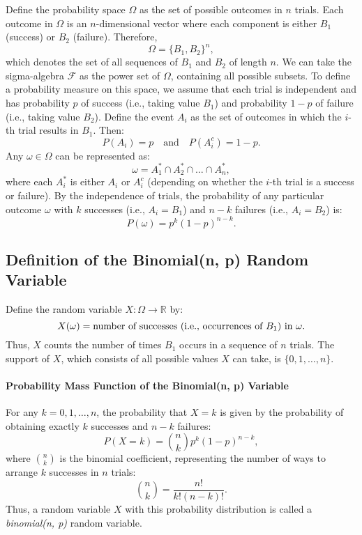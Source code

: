 Define the probability space \( \Omega \) as the set of possible outcomes in \( n \) trials. Each outcome in \( \Omega \) is an \( n \)-dimensional vector where each component is either \( B_1 \) (success) or \( B_2 \) (failure). Therefore, 
\[
\Omega = \{ B_1, B_2 \}^n,
\]
which denotes the set of all sequences of \( B_1 \) and \( B_2 \) of length \( n \). We can take the sigma-algebra \( \mathcal{F} \) as the power set of \( \Omega \), containing all possible subsets. To define a probability measure on this space, we assume that each trial is independent and has probability \( p \) of success (i.e., taking value \( B_1 \)) and probability \( 1 - p \) of failure (i.e., taking value \( B_2 \)). Define the event \( A_i \) as the set of outcomes in which the \( i \)-th trial results in \( B_1 \). Then:
\[
P(A_i) = p \quad \text{and} \quad P(A_i^c) = 1 - p.
\]
Any \(\omega \in \Omega\) can be represented as:
\[
\omega = A_1^{*} \cap A_2^{*} \cap \dots \cap A_n^{*},
\]
where each \( A_i^{*} \) is either \( A_i \) or \( A_i^c \) (depending on whether the \( i \)-th trial is a success or failure). \newline
By the independence of trials, the probability of any particular outcome \(\omega\) with \( k \) successes (i.e., \( A_i = B_1 \)) and \( n - k \) failures (i.e., \( A_i = B_2 \)) is:
\[
P(\omega) = p^k (1 - p)^{n - k}.
\]

\subsection{Definition of the Binomial(n, p) Random Variable}
Define the random variable \( X: \Omega \to \mathbb{R} \) by:
\[
X(\omega) = \text{number of successes (i.e., occurrences of \( B_1 \)) in } \omega.
\]
Thus, \( X \) counts the number of times \( B_1 \) occurs in a sequence of \( n \) trials. \newline
The support of \( X \), which consists of all possible values \( X \) can take, is \( \{0, 1, \dots, n\} \).

\paragraph{Probability Mass Function of the Binomial(n, p) Variable}

For any \( k = 0, 1, \dots, n \), the probability that \( X = k \) is given by the probability of obtaining exactly \( k \) successes and \( n - k \) failures:
\[
P(X = k) = \binom{n}{k} p^k (1 - p)^{n - k},
\]
where \( \binom{n}{k} \) is the binomial coefficient, representing the number of ways to arrange \( k \) successes in \( n \) trials:
\[
\binom{n}{k} = \frac{n!}{k!(n - k)!}.
\]
Thus, a random variable \( X \) with this probability distribution is called a \textit{binomial(n, p)} random variable.

